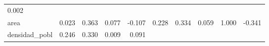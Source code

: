 \documentclass[]{article}
\begin{document}
\begin{longtable}[]{@{}lrrrrrrrrr@{}}
\begin{minipage}[t]{0.10\columnwidth}
0.002\strut
\end{minipage}\tabularnewline
\begin{minipage}[t]{0.10\columnwidth}\raggedright\strut
area\strut
\end{minipage} & \begin{minipage}[t]{0.08\columnwidth}\raggedleft\strut
0.023\strut
\end{minipage} & \begin{minipage}[t]{0.07\columnwidth}\raggedleft\strut
0.363\strut
\end{minipage} & \begin{minipage}[t]{0.10\columnwidth}\raggedleft\strut
0.077\strut
\end{minipage} & \begin{minipage}[t]{0.07\columnwidth}\raggedleft\strut
-0.107\strut
\end{minipage} & \begin{minipage}[t]{0.05\columnwidth}\raggedleft\strut
0.228\strut
\end{minipage} & \begin{minipage}[t]{0.07\columnwidth}\raggedleft\strut
0.334\strut
\end{minipage} & \begin{minipage}[t]{0.06\columnwidth}\raggedleft\strut
0.059\strut
\end{minipage} & \begin{minipage}[t]{0.05\columnwidth}\raggedleft\strut
1.000\strut
\end{minipage} & \begin{minipage}[t]{0.10\columnwidth}\raggedleft\strut
-0.341\strut
\end{minipage}\tabularnewline
\begin{minipage}[t]{0.10\columnwidth}\raggedright\strut
densidad\_pobl\strut
\end{minipage} & \begin{minipage}[t]{0.08\columnwidth}\raggedleft\strut
0.246\strut
\end{minipage} & \begin{minipage}[t]{0.07\columnwidth}\raggedleft\strut
0.330\strut
\end{minipage} & \begin{minipage}[t]{0.10\columnwidth}\raggedleft\strut
0.009\strut
\end{minipage} & \begin{minipage}[t]{0.07\columnwidth}\raggedleft\strut
0.091\strut
\end{minipage} & \begin{minipage}[t]{0.05\columnwidth}\raggedleft\strut

\end{minipage}
\end{longtable}
\end{document}
